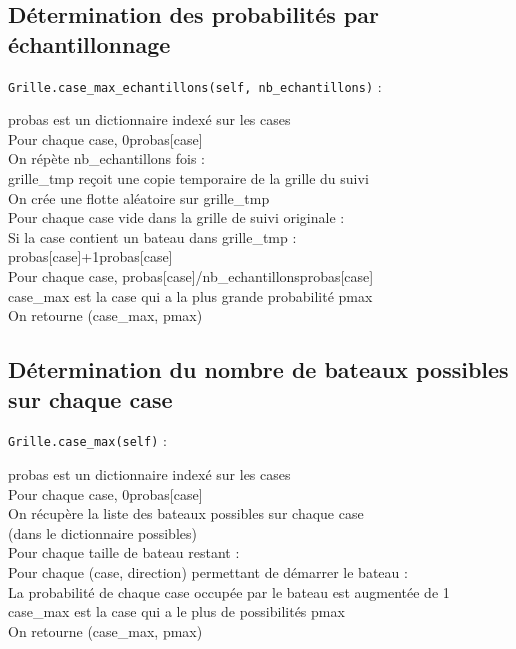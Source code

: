 \subsection{Détermination des probabilités par échantillonnage}\label{case_max_echantillons}
\texttt{Grille.case\_max\_echantillons(self, nb\_echantillons)} :
\begin{algo1}
probas est un dictionnaire indexé sur les cases\\
Pour chaque case, 0\sto probas[case]\\
On répète nb\_echantillons fois :\\
grille\_tmp reçoit une copie temporaire de la grille du suivi\\
On crée une flotte aléatoire sur grille\_tmp\\
Pour chaque case vide dans la grille de suivi originale :\\
Si la case contient un bateau dans grille\_tmp :\\
probas[case]+1\sto probas[case]\\
Pour chaque case, probas[case]/nb\_echantillons\sto probas[case]\\
case\_max est la case qui a la plus grande probabilité pmax\\
On retourne (case\_max, pmax)\\
\end{algo1}

\subsection{Détermination du nombre de bateaux possibles sur chaque case}\label{case_max}
\texttt{Grille.case\_max(self)} :
\begin{algo1}
probas est un dictionnaire indexé sur les cases\\
Pour chaque case, 0\sto probas[case]\\
On récupère la liste des bateaux possibles sur chaque case\\
 (dans le dictionnaire possibles)\\
Pour chaque taille de bateau restant :\\
Pour chaque (case, direction) permettant de démarrer le bateau :\\
La probabilité de chaque case occupée par le bateau est augmentée de 1\\
case\_max est la case qui a le plus de possibilités pmax\\
On retourne (case\_max, pmax)\\
\end{algo1}

